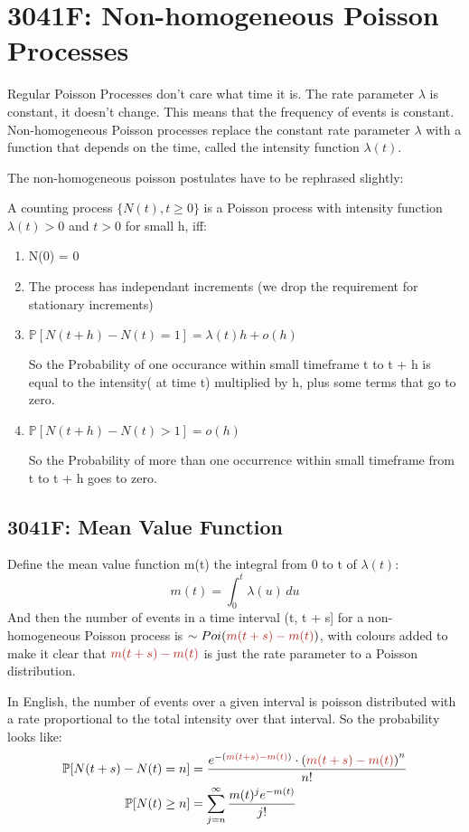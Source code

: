 \section{3041F: Non-homogeneous Poisson Processes}
Regular Poisson Processes don't care what time it is. 
The rate parameter \(\lambda\) is constant, it doesn't change. This means that the frequency of events is constant.
Non-homogeneous Poisson processes replace the constant rate parameter \(\lambda\) with a function that depends on the time, called the intensity function \(\lambda(t)\).

The non-homogeneous poisson postulates have to be rephrased slightly:

A counting process \(\{N(t), t \ge 0\}\) is a Poisson process with intensity function
\( \lambda(t) > 0 \) and \(t > 0 \) for small h, iff:
\begin{enumerate}
    \item N(0) = 0
    \item The process has independant increments (we drop the requirement for stationary increments)
    \item \(\mathbb{P}[N(t + h) - N(t) = 1] = \lambda(t) h + o(h)\)

        So the Probability of one occurance within small timeframe t to t + h is equal to the intensity( at time t) multiplied by h, plus some terms that go to zero.
    \item \(\mathbb{P}[N(t + h) - N(t) > 1] = o(h)\)

        So the Probability of more than one occurrence within small timeframe from t to t + h goes to zero.
\end{enumerate}
\subsection{3041F: Mean Value Function}
Define the mean value function m(t) the integral from 0 to t of \(\lambda(t)\):
\begin{equation*}
    m(t) = \int_{0}^{t} \lambda(u) \, du
\end{equation*}
And then the number of events in a time interval (t, t + s] for a
non-homogeneous Poisson process is $\sim Poi({\color{BrickRed}{m(t + s) -
m(t)}})$, with colours added to make it clear that ${\color{BrickRed}{m(t +
s) - m(t)}}$ is just the rate parameter to a Poisson distribution.


In English, the number of events over a given interval is poisson 
distributed with a rate proportional to the total intensity over that interval. So the probability looks like:
\begin{equation*}
    \begin{aligned}
        \mathbb{P}[N(t + s) - N(t) = n] &= \frac{
            e^{-\left({\color{BrickRed}{m(t+s) - m(t)}}\right)} 
            \cdot \left( {\color{BrickRed}{m(t+s) - m(t)}}\right)^n
        }{n!} \\
        \mathbb{P}[N(t) \ge n] &= \sum_{j=n}^{\infty} \frac{ m(t)^j e^{-m(t)}
        }{ j!  } \\
        \end{aligned}
    \end{equation*}
